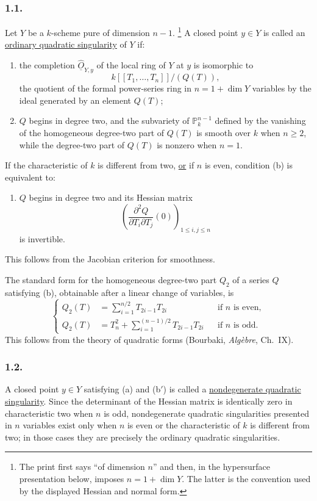 \subsubsection*{1.1.}
Let $Y$ be a $k$-scheme pure of dimension $n-1$.
\footnote{The print first says ``of dimension $n$'' and then, in the
hypersurface presentation below, imposes $n=1+\dim Y$.  The latter is
the convention used by the displayed Hessian and normal form.}
A closed point $y\in Y$ is called an \underline{ordinary quadratic
singularity} of $Y$ if:
\begin{enumerate}
\item[(a)] the completion $\widehat{\underline O}_{Y,y}$ of the local
ring of $Y$ at $y$ is isomorphic to
\[
k[[T_1,\ldots,T_n]]/(Q(T)),
\]
the quotient of the formal power-series ring in
$n=1+\dim Y$ variables by the ideal generated by an element $Q(T)$;
\item[(b)] $Q$ begins in degree two, and the subvariety of
$\mathbb P^{n-1}_k$ defined by the vanishing of the homogeneous
degree-two part of $Q(T)$ is smooth over $k$ when $n\geq2$, while the
degree-two part of $Q(T)$ is nonzero when $n=1$.
\end{enumerate}

If the characteristic of $k$ is different from two, \underline{or} if
$n$ is even, condition (b) is equivalent to:
\begin{enumerate}
\item[(b$'$)] $Q$ begins in degree two and its Hessian matrix
\[
\left(
  \frac{\partial^2Q}{\partial T_i\partial T_j}(0)
\right)_{1\leq i,j\leq n}
\]
is invertible.
\end{enumerate}
This follows from the Jacobian criterion for smoothness.

The standard form for the homogeneous degree-two part $Q_2$ of a
series $Q$ satisfying (b), obtainable after a linear change of
variables, is
\begin{equation}\tag{1.1.1}
\left\{
\begin{aligned}
Q_2(T)&=\sum_{i=1}^{n/2}T_{2i-1}T_{2i}
  &&\text{if $n$ is even},\\[1ex]
Q_2(T)&=T_n^2+\sum_{i=1}^{(n-1)/2}T_{2i-1}T_{2i}
  &&\text{if $n$ is odd}.
\end{aligned}
\right.
\end{equation}
This follows from the theory of quadratic forms (Bourbaki,
\emph{Alg\`ebre}, Ch.~IX).

\subsubsection*{1.2.}
A closed point $y\in Y$ satisfying (a) and (b$'$) is called a
\underline{nondegenerate quadratic singularity}.  Since the
determinant of the Hessian matrix is identically zero in
characteristic two when $n$ is odd, nondegenerate quadratic
singularities presented in $n$ variables exist only when $n$ is even
or the characteristic of $k$ is different from two; in those cases
they are precisely the ordinary quadratic singularities.
